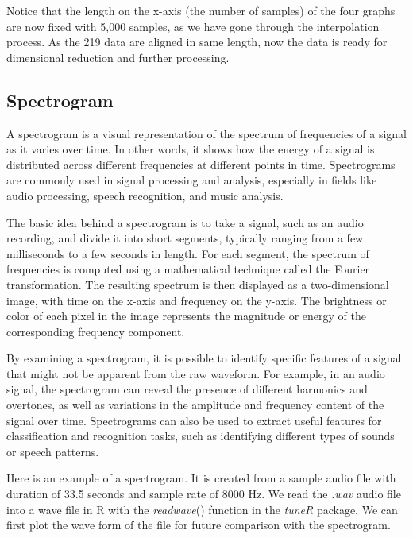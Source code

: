 Notice that the length on the x-axis (the number of samples) of the four graphs are now fixed with 5,000 samples, as we have gone through the interpolation process. As the 219 data are aligned in same length, now the data is ready for dimensional reduction and further processing.


\newpage
\subsection{Spectrogram}


A spectrogram is a visual representation of the spectrum of frequencies of a signal as it varies over time. In other words, it shows how the energy of a signal is distributed across different frequencies at different points in time. Spectrograms are commonly used in signal processing and analysis, especially in fields like audio processing, speech recognition, and music analysis.

The basic idea behind a spectrogram is to take a signal, such as an audio recording, and divide it into short segments, typically ranging from a few milliseconds to a few seconds in length. For each segment, the spectrum of frequencies is computed using a mathematical technique called the Fourier transformation. The resulting spectrum is then displayed as a two-dimensional image, with time on the x-axis and frequency on the y-axis. The brightness or color of each pixel in the image represents the magnitude or energy of the corresponding frequency component.

By examining a spectrogram, it is possible to identify specific features of a signal that might not be apparent from the raw waveform. For example, in an audio signal, the spectrogram can reveal the presence of different harmonics and overtones, as well as variations in the amplitude and frequency content of the signal over time. Spectrograms can also be used to extract useful features for classification and recognition tasks, such as identifying different types of sounds or speech patterns.

Here is an example of a spectrogram. It is created from a sample audio file with duration of 33.5 seconds and sample rate of 8000 Hz. We read the \emph{.wav} audio file into a wave file in R with the \emph{readwave}() function in the \emph{tuneR} package. We can first plot the wave form of the file for future comparison with the spectrogram.

